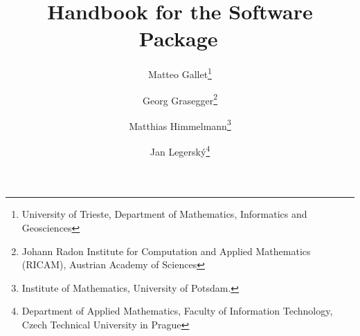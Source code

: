 \documentclass[]{article}
\title{Handbook for the Software Package\, \raisebox{-0.15\totalheight}{\texttt{[image: icon.jpg]}}}
\author{Matteo Gallet\thanks{University of Trieste, Department of Mathematics, Informatics and Geosciences} 
	\and Georg Grasegger\thanks{Johann Radon Institute for Computation and Applied Mathematics (RICAM),
		Austrian Academy of Sciences}
	\and Matthias Himmelmann\thanks{Institute of Mathematics, University of Potsdam.}
	\and Jan Legerský\thanks{Department of Applied Mathematics, Faculty of Information Technology,
		Czech Technical University in Prague}}
\begin{document}
\maketitle


\section{}
\end{document}

